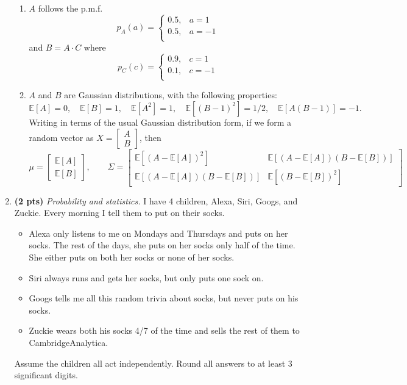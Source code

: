 \documentclass{article}
\newcommand{\bmat}{\left[\begin{matrix}}
\newcommand{\emat}{\end{matrix}\right]}
\newcommand{\bE}{\mathbb E}
\newcommand{\showpoints}[1]{\textbf{(#1)}}
\begin{document}
\begin{enumerate}
\begin{enumerate}
\item $A$ follows the p.m.f.
\[
p_A(a) = \begin{cases}
0.5, & a = 1\\
0.5, & a = -1\\
\end{cases}
\]
and $B = A\cdot C$ where
\[
p_C(c) = \begin{cases}
0.9, & c = 1\\
0.1, & c = -1\\
\end{cases}
\]


\item $A$ and $B$ are Gaussian distributions, with  the following properties: 
\[
\bE[A] = 0,\quad \bE[B] = 1, \quad\bE[A^2] = 1, \quad\bE[(B-1)^2] = 1/2, \quad\bE[A(B-1)] = -1.
\]
Writing in terms of the usual Gaussian distribution form, if we form a random vector as $X = \bmat A \\ B\emat$, then
\[
\mu = \bmat \bE[A]\\\bE[B]\emat, \qquad
\Sigma = \bmat \bE[(A-\bE[A])^2] & \bE[(A-\bE[A])(B-\bE[B])] \\\bE[(A-\bE[A])(B-\bE[B])] & \bE[(B-\bE[B])^2] \emat 
\]

\end{enumerate}




\item \showpoints{2 pts} \emph{Probability and statistics.}
 I have 4 children, Alexa, Siri, Googs, and Zuckie. 
Every morning I tell them to put on their socks.



\begin{itemize}

\item Alexa only listens to me on Mondays and Thursdays and puts on her socks. The rest of the days, she puts on her socks only half of the time. She either puts on both her socks or none of her socks. 


\item 
Siri always runs and gets her socks, but only puts one sock on. 

\item 
Googs tells me all this random trivia about socks, but never puts on his socks.
\item 
Zuckie wears both his socks 4/7 of the time and sells the rest of them to  CambridgeAnalytica.
\end{itemize}

Assume the children all act independently.  Round all answers to at least 3 significant digits.


\end{enumerate}
\end{document}
